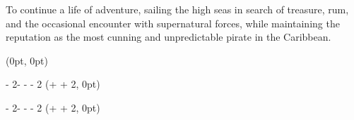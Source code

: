 \documentclass[11pt, a4paper]{../../resume}
\begin{document}
\makecvheader


\begin{cvsummary}
    To continue a life of adventure, sailing the high seas in search of
    treasure, rum, and the occasional encounter with supernatural forces, while
    maintaining the reputation as the most cunning and unpredictable pirate in
    the Caribbean.
\end{cvsummary}


\setlength{\iconswidth}{10.7pt}

\setlength{\leftcolumnwidth}{5cm}
\setlength{\leftcolumnrightmargin}{0cm}
\setlength{\timelinemargin}{0.4cm}


\begin{textblock*}{\leftcolumnwidth}(0pt, 0pt)
    \begin{mdframed}
        
        
        
    \end{mdframed}
\end{textblock*}

\begin{textblock*}
    {\paperwidth - 2\sidemargin - \leftcolumnwidth - \leftcolumnrightmargin - 2\timelinemargin}
    (\leftcolumnwidth + \leftcolumnrightmargin + 2\timelinemargin, 0pt)
    \begin{mdframed}
        
        
    \end{mdframed}
\end{textblock*}

\newpage
\setlength{\leftcolumnwidth}{-\leftcolumnrightmargin}


\begin{textblock*}
    {\paperwidth - 2\sidemargin - \leftcolumnwidth - \leftcolumnrightmargin - 2\timelinemargin}
    (\leftcolumnwidth + \leftcolumnrightmargin + 2\timelinemargin, 0pt)
    \begin{mdframed}
        \vspace{-2mm}
        
        
    \end{mdframed}
\end{textblock*}

\newpage
\setlength{\leftcolumnwidth}{-\timelinemargin}

\begin{mdframed}

\end{mdframed}
\end{document}

